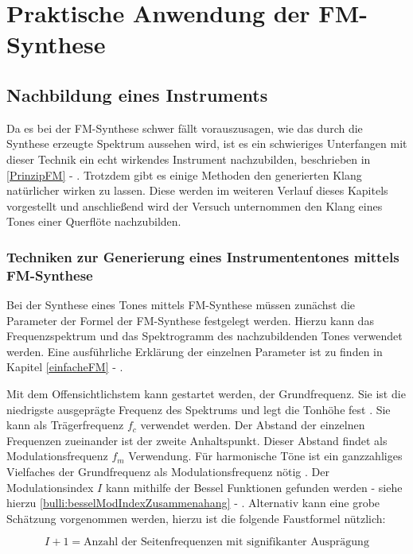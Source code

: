 \section{Praktische Anwendung der FM-Synthese}
\FloatBarrier
\subsection{Nachbildung eines Instruments}
Da es bei der FM-Synthese schwer fällt vorauszusagen, wie das durch die Synthese erzeugte Spektrum aussehen wird, ist es ein schwieriges Unterfangen mit dieser Technik ein echt wirkendes Instrument nachzubilden, beschrieben in \ref{PrinzipFM} - .
Trotzdem gibt es einige Methoden den generierten Klang natürlicher wirken zu lassen. Diese werden im weiteren Verlauf dieses Kapitels vorgestellt und anschließend wird der Versuch unternommen den Klang eines Tones einer Querflöte nachzubilden.

\FloatBarrier
\subsubsection{Techniken zur Generierung eines Instrumententones mittels FM-Synthese}

Bei der Synthese eines Tones mittels FM-Synthese müssen zunächst die Parameter der Formel der FM-Synthese festgelegt werden. Hierzu kann das Frequenzspektrum und das Spektrogramm des nachzubildenden Tones verwendet werden. Eine ausführliche Erklärung der einzelnen Parameter ist zu finden in Kapitel \ref{einfacheFM} - . 

Mit dem Offensichtlichstem kann gestartet werden, der Grundfrequenz. Sie ist die niedrigste ausgeprägte Frequenz des Spektrums und legt die Tonhöhe fest \cite[S. 53]{barkowsky}. Sie kann als Trägerfrequenz $f_c$ verwendet werden. Der Abstand der einzelnen Frequenzen zueinander ist der zweite Anhaltspunkt. Dieser Abstand findet als Modulationsfrequenz $f_m$ Verwendung. Für harmonische Töne ist ein ganzzahliges Vielfaches der Grundfrequenz als Modulationsfrequenz nötig \cite[S. 528]{chowningPaper}. Der Modulationsindex $I$ kann mithilfe der Bessel Funktionen gefunden werden - siehe hierzu \ref{bulli:besselModIndexZusammenahang} - . Alternativ kann eine grobe Schätzung vorgenommen werden, hierzu ist die folgende Faustformel nützlich:

\begin{equation}
\label{eq:faustformel}
I + 1 = \text{Anzahl der Seitenfrequenzen mit signifikanter Ausprägung}
\end{equation}

